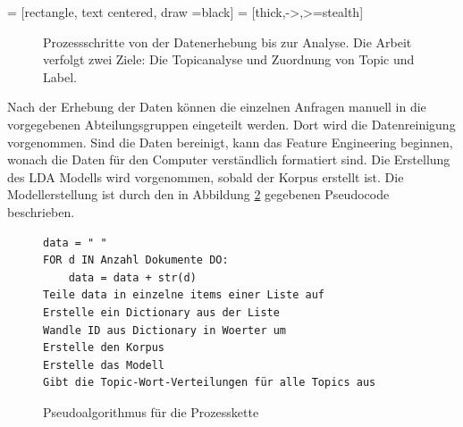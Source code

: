 \documentclass[german,version-2020-11]{uzl-thesis}
\begin{document}
 = [rectangle, text centered, draw =black]
 = [thick,->,>=stealth]
\begin{figure}[H]
\begin{center}
\caption{Prozessschritte von der Datenerhebung bis zur Analyse. Die Arbeit verfolgt zwei Ziele: Die Topicanalyse und Zuordnung von Topic und Label.}
\label{fig:flowchart}
\end{center}
\end{figure}

Nach der Erhebung der Daten können die einzelnen Anfragen manuell in die vorgegebenen Abteilungsgruppen eingeteilt werden. Dort wird die Datenreinigung vorgenommen. Sind die Daten bereinigt, kann das Feature Engineering beginnen, wonach die Daten für den Computer verständlich formatiert sind. Die Erstellung des LDA Modells wird vorgenommen, sobald der Korpus erstellt ist. Die Modellerstellung ist durch den in Abbildung \ref{fig:code1} gegebenen Pseudocode beschrieben. \\


\begin{figure}[h]
\begin{lstlisting}
data = " "
FOR d IN Anzahl Dokumente DO:
    data = data + str(d)
Teile data in einzelne items einer Liste auf
Erstelle ein Dictionary aus der Liste
Wandle ID aus Dictionary in Woerter um
Erstelle den Korpus
Erstelle das Modell
Gibt die Topic-Wort-Verteilungen für alle Topics aus
\end{lstlisting}	
\caption{Pseudoalgorithmus für die Prozesskette}
\label{fig:code1}
\end{figure}
\end{document}

